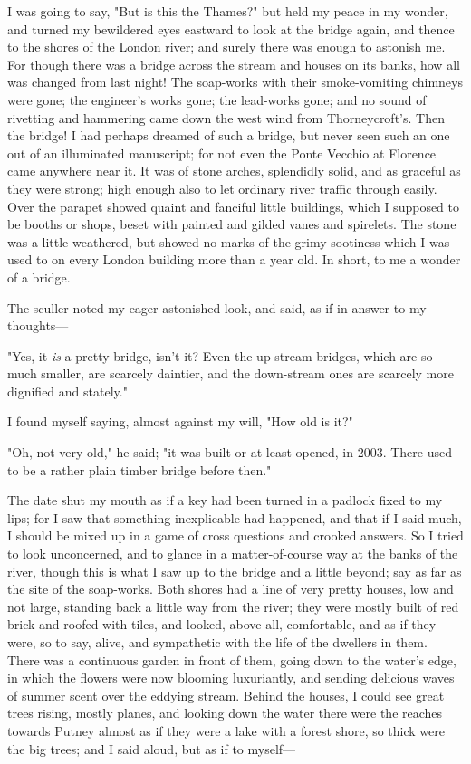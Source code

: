 I was going to say, "But is this the Thames?" but held my peace in my
wonder, and turned my bewildered eyes eastward to look at the bridge
again, and thence to the shores of the London river; and surely there
was enough to astonish me. For though there was a bridge across the
stream and houses on its banks, how all was changed from last night! The
soap-works with their smoke-vomiting chimneys were gone; the engineer's
works gone; the lead-works gone; and no sound of rivetting and hammering
came down the west wind from Thorneycroft's. Then the bridge! I had
perhaps dreamed of such a bridge, but never seen such an one out of an
illuminated manuscript; for not even the Ponte Vecchio at Florence came
anywhere near it. It was of stone arches, splendidly solid, and as
graceful as they were strong; high enough also to let ordinary river
traffic through easily. Over the parapet showed quaint and fanciful
little buildings, which I supposed to be booths or shops, beset with
painted and gilded vanes and spirelets. The stone was a little
weathered, but showed no marks of the grimy sootiness which I was used
to on every London building more than a year old. In short, to me a
wonder of a bridge.

The sculler noted my eager astonished look, and said, as if in answer to
my thoughts---

"Yes, it \emph{is} a pretty bridge, isn't it? Even the up-stream
bridges, which are so much smaller, are scarcely daintier, and the
down-stream ones are scarcely more dignified and stately."

I found myself saying, almost against my will, "How old is it?"

"Oh, not very old," he said; "it was built or at least opened, in 2003.
There used to be a rather plain timber bridge before then."

The date shut my mouth as if a key had been turned in a padlock fixed to
my lips; for I saw that something inexplicable had happened, and that if
I said much, I should be mixed up in a game of cross questions and
crooked answers. So I tried to look unconcerned, and to glance in a
matter-of-course way at the banks of the river, though this is what I
saw up to the bridge and a little beyond; say as far as the site of the
soap-works. Both shores had a line of very pretty houses, low and not
large, standing back a little way from the river; they were mostly built
of red brick and roofed with tiles, and looked, above all, comfortable,
and as if they were, so to say, alive, and sympathetic with the life of
the dwellers in them. There was a continuous garden in front of them,
going down to the water's edge, in which the flowers were now blooming
luxuriantly, and sending delicious waves of summer scent over the
eddying stream. Behind the houses, I could see great trees rising,
mostly planes, and looking down the water there were the reaches towards
Putney almost as if they were a lake with a forest shore, so thick were
the big trees; and I said aloud, but as if to myself---

